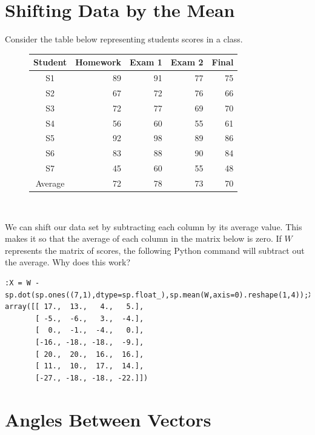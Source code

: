 \label{Stats1}


\section*{Shifting Data by the Mean}

Consider the table below representing students scores in a class.\\

\begin{figure}[h!]
\begin{center}
\begin{tabular}{|c|r|r|r|r|}
	\hline
Student & Homework & Exam 1  & Exam 2 & Final \\
\hline
S1  & 89 & 91 & 77 & 75 \\
S2  & 67 & 72 & 76 & 66 \\
S3  & 72 & 77 & 69 & 70 \\
S4  & 56 & 60 & 55 & 61 \\
S5  & 92 & 98 & 89 & 86 \\
S6  & 83 & 88 & 90 & 84 \\
S7  & 45 & 60 & 55 & 48 \\
\hline
Average  & 72 & 78 & 73 & 70\\
\hline
\end{tabular}\\
\end{center}
\end{figure}

We can shift our data set by subtracting each column by its average value.  This makes it so that the average of each column in the matrix below is zero.  If $W$ represents the matrix of scores, the following Python command will subtract out the average.  Why does this work?
\begin{lstlisting}[style=python]
:X = W - sp.dot(sp.ones((7,1),dtype=sp.float_),sp.mean(W,axis=0).reshape(1,4));X
array([[ 17.,  13.,   4.,   5.],
       [ -5.,  -6.,   3.,  -4.],
       [  0.,  -1.,  -4.,   0.],
       [-16., -18., -18.,  -9.],
       [ 20.,  20.,  16.,  16.],
       [ 11.,  10.,  17.,  14.],
       [-27., -18., -18., -22.]])
\end{lstlisting}


\section*{Angles Between Vectors}

